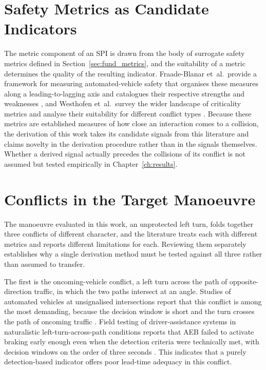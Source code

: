 \section{Safety Metrics as Candidate Indicators}
\label{sec:sota_metrics}

The metric component of an \ac{SPI} is drawn from the body of surrogate safety
metrics defined in Section~\ref{sec:fund_metrics}, and the suitability of a metric
determines the quality of the resulting indicator. Fraade-Blanar et~al.\ provide a
framework for measuring automated-vehicle safety that organises these measures along a
leading-to-lagging axis and catalogues their respective strengths and weaknesses
\cite{fraadeblanar2018}, and Westhofen et~al.\ survey the wider landscape of criticality
metrics and analyse their suitability for different conflict types \cite{westhofen2023}.
Because these metrics are established measures of how close an interaction comes to a
collision, the derivation of this work takes its candidate signals from this literature
and claims novelty in the derivation procedure rather than in the signals themselves.
Whether a derived signal actually precedes the collisions of its conflict is not
assumed but tested empirically in Chapter~\ref{ch:results}.

\section{Conflicts in the Target Manoeuvre}
\label{sec:sota_conflicts}

The manoeuvre evaluated in this work, an unprotected left turn, folds together three
conflicts of different character, and the literature treats each with different metrics
and reports different limitations for each. Reviewing them separately establishes why a
single derivation method must be tested against all three rather than assumed to
transfer.

The first is the oncoming-vehicle conflict, a left turn across the path of
opposite-direction traffic, in which the two paths intersect at an angle. Studies of automated vehicles at unsignalised intersections report that
this conflict is among the most demanding, because the decision window is short and the
turn crosses the path of oncoming traffic \cite{leftturn_unsignalized}. Field testing
of driver-assistance systems in naturalistic left-turn-across-path conditions reports
that \ac{AEB} failed to activate braking early enough even when the
detection criteria were technically met, with decision windows on the order of three
seconds \cite{leftturn_field2025}. This indicates that a purely detection-based
indicator offers poor lead-time adequacy in this conflict.

